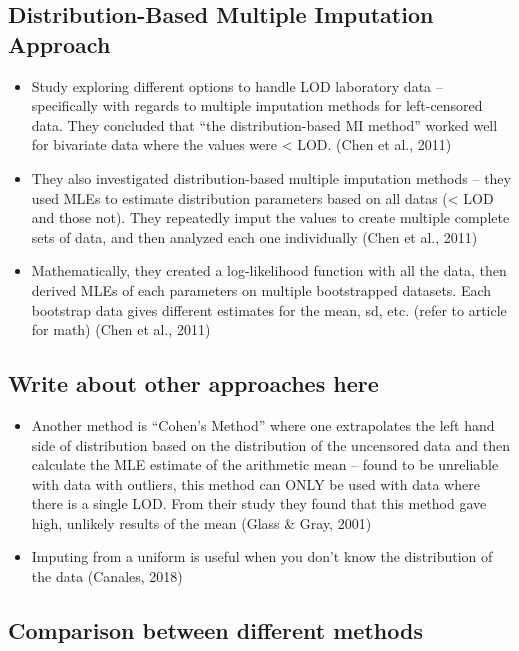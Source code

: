 \documentclass[12pt, twoside]{amherstthesis}
\begin{document}
\hypertarget{DBML}{%
\subsection{Distribution-Based Multiple Imputation Approach}\label{DBML}}
\begin{itemize}
\item
  Study exploring different options to handle LOD laboratory data -- specifically with regards to multiple imputation methods for left-censored data. They concluded that ``the distribution-based MI method'' worked well for bivariate data where the values were \textless{} LOD. (Chen et al., 2011)
\item
  They also investigated distribution-based multiple imputation methods -- they used MLEs to estimate distribution parameters based on all datas (\textless{} LOD and those not). They repeatedly imput the values to create multiple complete sets of data, and then analyzed each one individually (Chen et al., 2011)
\item
  Mathematically, they created a log-likelihood function with all the data, then derived MLEs of each parameters on multiple bootstrapped datasets. Each bootstrap data gives different estimates for the mean, sd, etc. (refer to article for math) (Chen et al., 2011)
\end{itemize}
\hypertarget{write-about-other-approaches-here}{%
\subsection{Write about other approaches here}\label{write-about-other-approaches-here}}
\begin{itemize}
\item
  Another method is ``Cohen's Method'' where one extrapolates the left hand side of distribution based on the distribution of the uncensored data and then calculate the MLE estimate of the arithmetic mean -- found to be unreliable with data with outliers, this method can ONLY be used with data where there is a single LOD. From their study they found that this method gave high, unlikely results of the mean (Glass \& Gray, 2001)
\item
  Imputing from a uniform is useful when you don't know the distribution of the data (Canales, 2018)
\end{itemize}
\hypertarget{comparison-between-different-methods}{%
\subsection{Comparison between different methods}\label{comparison-between-different-methods}}
\end{document}

